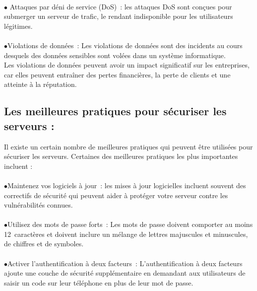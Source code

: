 \paragraph{ }$\bullet$ Attaques par déni de service (DoS) :  les attaques DoS sont conçues pour submerger un serveur de trafic, le rendant indisponible pour les utilisateurs légitimes.\\
 
 \paragraph{ }$\bullet$Violations de données :  Les violations de données sont des incidents au cours desquels des données sensibles sont volées dans un système informatique.
 \\ Les violations de données peuvent avoir un impact significatif sur les entreprises, car elles peuvent entraîner des pertes financières, la perte de clients et une atteinte à la réputation.

 \paragraph{}\subsection{Les meilleures pratiques pour sécuriser les serveurs :}
 

Il existe un certain nombre de meilleures pratiques qui peuvent être utilisées pour sécuriser les serveurs. Certaines des meilleures pratiques les plus importantes incluent :

\paragraph{ } $\bullet$Maintenez vos logiciels à jour :   les mises à jour logicielles incluent souvent des correctifs de sécurité qui peuvent aider à protéger votre serveur contre les vulnérabilités connues.\\
 \paragraph{ }$\bullet$Utilisez des mots de passe forts :  Les mots de passe doivent comporter au moins 12 caractères et doivent inclure un mélange de lettres majuscules et minuscules, de chiffres et de symboles.\\
\paragraph{ }$\bullet$Activer l'authentification à deux facteurs :  L'authentification à deux facteurs ajoute une couche de sécurité supplémentaire en demandant aux utilisateurs de saisir un code sur leur téléphone en plus de leur mot de passe.\\

